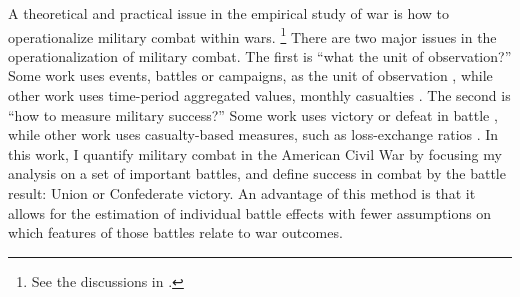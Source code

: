 A theoretical and practical issue in the empirical study of war is how to operationalize military combat within wars.%
\footnote{
  See the discussions in \textcites{ReiterStam1998}{BiddleLong2004}{Reiter2003}{GrauerHorowitz2012}{Weisiger2015}.
}
There are two major issues in the operationalization of military combat.
The first is ``what the unit of observation?''
Some work uses events, \eg{}battles or campaigns, as the unit of observation \parencites{ReiterStam1998}{ReiterStam2002}{Ramsay2008}[59-60]{Reiter2009}{PilsterBoehmelt2011a}{GrauerHorowitz2012}, while other work uses time-period aggregated values, \eg{}monthly casualties \parencite{Weisiger2015}.
The second is ``how to measure military success?''
Some work uses victory or defeat in battle \parencites{ReiterStam1998}{ReiterStam2002}{GrauerHorowitz2012}, while other work uses casualty-based measures, such as loss-exchange ratios  \parencites{Biddle2004}{BiddleLong2004}{PilsterBoehmelt2011a}.
In this work, I quantify military combat in the American Civil War by focusing my analysis on a set of important battles, and define success in combat by the battle result: Union or Confederate victory.
An advantage of this method is that it allows for the estimation of individual battle effects with fewer assumptions on which features of those battles relate to war outcomes.

